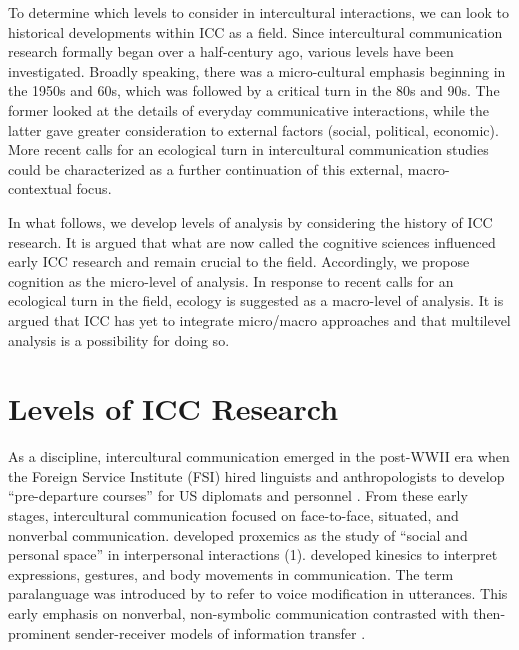 To determine which levels to consider in intercultural interactions, we can look to historical developments within ICC as a field. Since intercultural communication research formally began over a half-century ago, various levels have been investigated. Broadly speaking, there was a micro-cultural emphasis beginning in the 1950s and 60s, which was followed by a critical turn in the 80s and 90s. The former looked at the details of everyday communicative interactions, while the latter gave greater consideration to external factors (social, political, economic). More recent calls for an ecological turn in intercultural communication studies could be characterized as a further continuation of this external, macro-contextual focus.

In what follows, we develop levels of analysis by considering the history of ICC research. It is argued that what are now called the cognitive sciences influenced early ICC research and remain crucial to the field. Accordingly, we propose cognition as the micro-level of analysis. In response to recent calls for an ecological turn in the field, ecology is suggested as a macro-level of analysis. It is argued that ICC has yet to integrate micro/macro approaches and that multilevel analysis is a possibility for doing so. 

\section{Levels of ICC Research}

As a discipline, intercultural communication emerged in the post-WWII era when the Foreign Service Institute (FSI) hired linguists and anthropologists to develop ``pre-departure courses'' for US diplomats and personnel \citep[4546]{LeedsHurwitz2013a, Martin2010a}. From these early stages, intercultural communication focused on face-to-face, situated, and nonverbal communication. \cite*{Hall1966a} developed proxemics as the study of ``social and personal space'' in interpersonal interactions (1). \cite*{Birdwhistell1952a} developed kinesics to interpret expressions, gestures, and body movements in communication. The term paralanguage was introduced by \cite*{Trager1958a} to refer to voice modification in utterances. This early emphasis on nonverbal, non-symbolic communication contrasted with then-prominent sender-receiver models of information transfer \citep[e.g.,][]{Shannon1949}.

